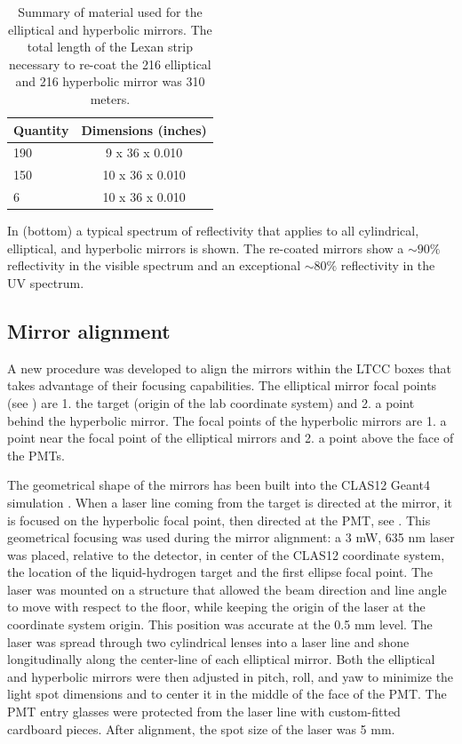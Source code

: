\begin{table}
	\begin{center}
		\begin{tabular}{| l | c |}
			\hline \hline
			Quantity  & Dimensions (inches) \\
			\hline
			190       & 9  x 36 x 0.010  \\
			150       & 10 x 36 x 0.010  \\
			6         & 10 x 36 x 0.010  \\
			\hline \hline
		\end{tabular}
	\end{center}
	\caption{Summary of material used for the elliptical and hyperbolic mirrors. The total length of the Lexan strip necessary to re-coat the 216 elliptical
            and 216 hyperbolic mirror was 310 meters.}\label{tab:strips}
\end{table}


In  (bottom) a typical spectrum of reflectivity that applies to all cylindrical, elliptical, and hyperbolic mirrors is shown.
The re-coated mirrors show a $\sim 90\%$ reflectivity in the visible spectrum and an exceptional $\sim 80\%$
reflectivity in the UV spectrum.



\subsection{Mirror alignment}

A new procedure was developed to align the mirrors within the LTCC boxes that takes advantage of their focusing capabilities.
The elliptical mirror focal points (see ) are 1. the target (origin of the lab coordinate system)
and 2. a point behind the hyperbolic mirror. The focal points of the hyperbolic mirrors are 1. a point near the focal point of the elliptical mirrors and
2. a point above the face of the PMTs.

The geometrical shape of the mirrors has been built into the CLAS12 Geant4 simulation \cite{gemc2019}.
When a laser line coming from the target is directed at the mirror,
it is focused on the hyperbolic focal point, then directed at the PMT, see .
This geometrical focusing was used during the mirror alignment: a 3 mW, 635 nm laser was placed, relative to the detector,
in center of the CLAS12 coordinate system, the location of the liquid-hydrogen target and the first ellipse focal point.
The laser was mounted on a structure that allowed the beam direction and line angle to move with respect to the floor, while keeping
the origin of the laser at the coordinate system origin.
This position was accurate at the 0.5 mm level. The laser was spread through two cylindrical lenses into a laser line and shone
longitudinally along the center-line of each elliptical mirror. Both the elliptical and hyperbolic mirrors were then
adjusted in pitch, roll, and yaw to minimize the light spot dimensions and to center it in the middle of the face of the PMT.
The PMT entry glasses were protected from the laser line with custom-fitted cardboard pieces. After alignment, the spot size of the laser was 5 mm.


